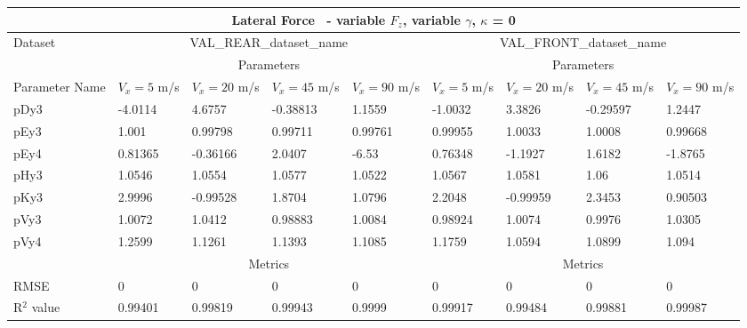         \begin{tabular}{lllll|llll} \hline \multicolumn{9}{c}{Lateral Force~ - variable $F_z$, variable $\gamma$, $\kappa$ = 0}                                                                                                                                                                        \\ \hline Dataset                         & \multicolumn{4}{c|}{VAL\_REAR\_dataset\_name}                                                & \multicolumn{4}{c}{VAL\_FRONT\_dataset\_name}                                                     \\ \hline \multicolumn{1}{c}{}            & \multicolumn{4}{c|}{Parameters}                                                              & \multicolumn{4}{c}{Parameters}                                                                    \\ \hline Parameter Name                  & $V_x = 5$ m/s     & $V_x = 20$ m/s     & $V_x = 45$ m/s     & $V_x = 90$ m/s     & $V_x = 5$ m/s      & $V_x = 20$ m/s      & $V_x = 45$ m/s      & $V_x = 90$ m/s       \\ pDy3                            & -4.0114 & 4.6757 & -0.38813 & 1.1559 & -1.0032 & 3.3826 & -0.29597 & 1.2447  \\ pEy3                            & 1.001 & 0.99798 & 0.99711 & 0.99761 & 0.99955 & 1.0033 & 1.0008 & 0.99668  \\ pEy4                            & 0.81365 & -0.36166 & 2.0407 & -6.53 & 0.76348 & -1.1927 & 1.6182 & -1.8765  \\ pHy3                            & 1.0546 & 1.0554 & 1.0577 & 1.0522 & 1.0567 & 1.0581 & 1.06 & 1.0514  \\ pKy3                            & 2.9996 & -0.99528 & 1.8704 & 1.0796 & 2.2048 & -0.99959 & 2.3453 & 0.90503  \\ pVy3                            & 1.0072 & 1.0412 & 0.98883 & 1.0084 & 0.98924 & 1.0074 & 0.9976 & 1.0305  \\ pVy4                            & 1.2599 & 1.1261 & 1.1393 & 1.1085 & 1.1759 & 1.0594 & 1.0899 & 1.094  \\ \hline \multicolumn{1}{c|}{}           & \multicolumn{4}{c|}{Metrics}                                                                 & \multicolumn{4}{c}{Metrics}                                                                       \\ \hline RMSE                            & 0 & 0 & 0 & 0 & 0 & 0 & 0 & 0  \\ R$^2$ value                       & 0.99401   & 0.99819   & 0.99943   & 0.9999   & 0.99917   & 0.99484   & 0.99881   & 0.99987    \\ \hline \end{tabular} 